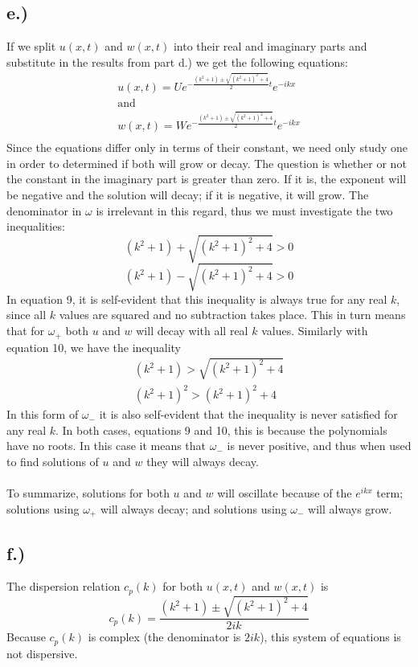 \documentclass{article}
\begin{document}
\subsection*{e.)}
If we split $u(x, t)$ and $w(x,t)$ into their real and imaginary parts and substitute in the results from part d.) we get the following equations:
\begin{equation}
\begin{aligned}
u(x, t) = Ue^{-\frac{(k^2 + 1) \pm \sqrt{(k^2 + 1)^2 +4}}{2}t}e^{-ikx}\\
\text{and}\\
w(x, t) = We^{-\frac{(k^2 + 1) \pm \sqrt{(k^2 + 1)^2 +4}}{2}t}e^{-ikx}\\
\end{aligned}
\end{equation}
Since the equations differ only in terms of their constant, we need only study one in order to determined if both will grow or decay. The question is whether or not the constant in the imaginary part is greater than zero. If it is, the exponent will be negative and the solution will decay; if it is negative, it will grow. The denominator in $\omega$ is irrelevant in this regard, thus we must investigate the two inequalities:
\begin{equation}
(k^2 + 1) + \sqrt{(k^2 + 1)^2 +4} > 0
\end{equation}
\begin{equation}
(k^2 + 1) - \sqrt{(k^2 + 1)^2 +4} > 0
\end{equation}
In equation 9, it is self-evident that this inequality is always true for any real $k$, since all $k$ values are squared and no subtraction takes place. This in turn means that for $\omega_+$ both $u$ and $w$ will decay with all real $k$ values.
Similarly with equation 10, we have the inequality
\begin{equation}
\begin{aligned}
(k^2 + 1) > \sqrt{(k^2 + 1)^2 +4}\\
(k^2 + 1)^2 > (k^2 +1)^2 + 4
\end{aligned}
\end{equation}
In this form of $\omega_-$ it is also self-evident that the inequality is never satisfied for any real $k$. In both cases, equations 9 and 10, this is because the polynomials have no roots. In this case it means that $\omega_-$ is never positive, and thus when used to find solutions of $u$ and $w$ they will always decay.
\\
\\
To summarize, solutions for both $u$ and $w$ will oscillate because of the $e^{ikx}$ term; solutions using $\omega_+$ will always decay; and solutions using $\omega_-$ will always grow.
\subsection*{f.)}
The dispersion relation $c_p(k)$ for both $u(x,t)$ and $w(x, t)$ is 
\begin{equation}
c_p(k) = \frac{(k^2 + 1) \pm \sqrt{(k^2 + 1)^2 +4}}{2ik}
\end{equation}
Because $c_p(k)$ is complex (the denominator is $2ik$), this system of equations is not dispersive. 
\end{document}
